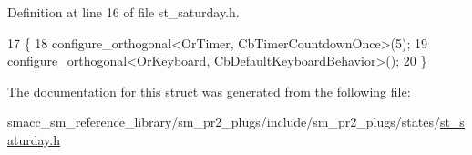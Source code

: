 Definition at line 16 of file st\+\_\+saturday.\+h.


\begin{DoxyCode}
17     \{
18         configure\_orthogonal<OrTimer,  CbTimerCountdownOnce>(5);   
19         configure\_orthogonal<OrKeyboard, CbDefaultKeyboardBehavior>();
20     \}
\end{DoxyCode}


The documentation for this struct was generated from the following file\+:\begin{DoxyCompactItemize}
\item 
smacc\+\_\+sm\+\_\+reference\+\_\+library/sm\+\_\+pr2\+\_\+plugs/include/sm\+\_\+pr2\+\_\+plugs/states/\hyperlink{sm__pr2__plugs_2include_2sm__pr2__plugs_2states_2st__saturday_8h}{st\+\_\+saturday.\+h}\end{DoxyCompactItemize}
